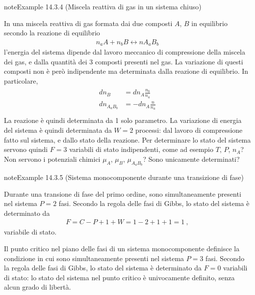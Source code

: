 \documentclass[letterpaper,10pt,italian]{jupyterBook}
\begin{document}
\label{ch/thermodynamics/principles-gibbs-phase-rule:example-7}
\begin{sphinxadmonition}{note}{Example 14.3.4 (Miscela reattiva di gas in un sistema chiuso)}



\sphinxAtStartPar
In una miscela reattiva di gas formata dai due composti \(A\), \(B\) in equilibrio secondo la reazione di equilibrio
\begin{equation*}
\begin{split}n_a A + n_b B \leftrightarrow n A_a B_b\end{split}
\end{equation*}
\sphinxAtStartPar
l’energia del sistema dipende dal lavoro meccanico di compressione della miscela dei gas, e dalla quantità dei 3 composti presenti nel gas. La variazione di questi composti non è però indipendente ma determinata dalla reazione di equilibrio. In particolare,
\begin{equation*}
\begin{split}\begin{aligned}
  d n_{B} & = d n_{A} \frac{n_b}{n_a} \\
  d n_{A_a B_b} & = - d n_{A} \frac{n}{n_a} \\
\end{aligned}\end{split}
\end{equation*}
\sphinxAtStartPar
La reazione è quindi determinata da 1 solo parametro. La variazione di energia del sistema è quindi determinata da \(W=2\) processi: dal lavoro di compressione fatto sul sistema, e dallo stato della reazione. Per determinare lo stato del sistema servono quindi \(F=3\) variabili di stato indipendenti, come ad esempio  \(T\), \(P\), \(n_A\)? Non servono i potenziali chimici \(\mu_A\), \(\mu_B\), \(\mu_{A_a B_b}\)? Sono unicamente determinati?
\end{sphinxadmonition}
\label{ch/thermodynamics/principles-gibbs-phase-rule:example-8}
\begin{sphinxadmonition}{note}{Example 14.3.5 (Sistema monocomponente durante una transizione di fase)}



\sphinxAtStartPar
{} Durante una transione di fase del primo ordine, sono simultaneamente presenti nel sistema \(P = 2\) fasi. Secondo la regola delle fasi di Gibbs, lo stato del sistema è determinato da
\begin{equation*}
\begin{split}F = C - P + 1 + W = 1 - 2 + 1 + 1 = 1 \ ,\end{split}
\end{equation*}
\sphinxAtStartPar
variabile di stato.

\sphinxAtStartPar
{} Il punto critico nel piano delle fasi di un sistema mono\sphinxhyphen{}componente definisce la condizione in cui sono simultaneamente presenti nel sistema \(P = 3\) fasi. Secondo la regola delle fasi di Gibbs, lo stato del sistema è determinato da \(F = 0\) variabili di stato: lo stato del sistema nel punto critico è univocamente definito, senza alcun grado di libertà.
\end{sphinxadmonition}
\end{document}
